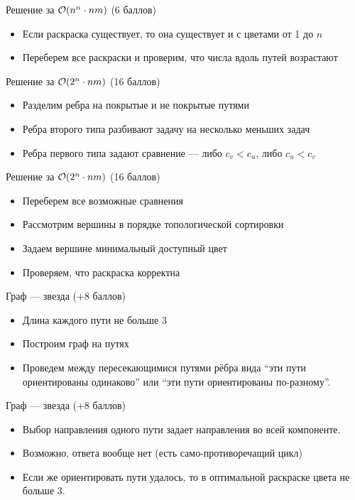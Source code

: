 \begin{frame}{Решение за $\mathcal{O}(n^n \cdot nm)$ (6 баллов)}
  \begin{itemize}
  \item Если раскраска существует, то она существует и с цветами от 1 до $n$
  \item Переберем все раскраски и проверим, что числа вдоль путей возрастают
  \end{itemize}
\end{frame}
\begin{frame}{Решение за $\mathcal{O}(2^n \cdot nm)$ (16 баллов)}
  \begin{itemize}
  \item Разделим ребра на покрытые и не покрытые путями
  \item Ребра второго типа разбивают задачу на несколько меньших задач
  \item Ребра первого типа задают сравнение --- либо $c_v < c_u$, либо $c_u < c_v$
  \end{itemize}
\end{frame}
\begin{frame}{Решение за $\mathcal{O}(2^n \cdot nm)$ (16 баллов)}
  \begin{itemize}
  \item Переберем все возможные сравнения
  \item Рассмотрим вершины в порядке топологической сортировки
  \item Задаем вершине минимальный доступный цвет
  \item Проверяем, что раскраска корректна
  \end{itemize}
\end{frame}

\begin{frame}{Граф --- звезда (+8 баллов)}
  \begin{itemize}
  \item Длина каждого пути не больше 3
  \item Построим граф на путях
  \item Проведем между пересекающимися путями рёбра вида ``эти пути ориентированы одинаково'' или ``эти
    пути ориентированы по-разному''.
  \end{itemize}
\end{frame}

\begin{frame}{Граф --- звезда (+8 баллов)}
  \begin{itemize}
  \item Выбор направления одного пути задает направления во всей компоненте.
  \item Возможно, ответа вообще нет (есть само-противоречащий цикл)
  \item Если же ориентировать пути удалось, то в оптимальной раскраске цвета не больше 3.
  \end{itemize}
\end{frame}

